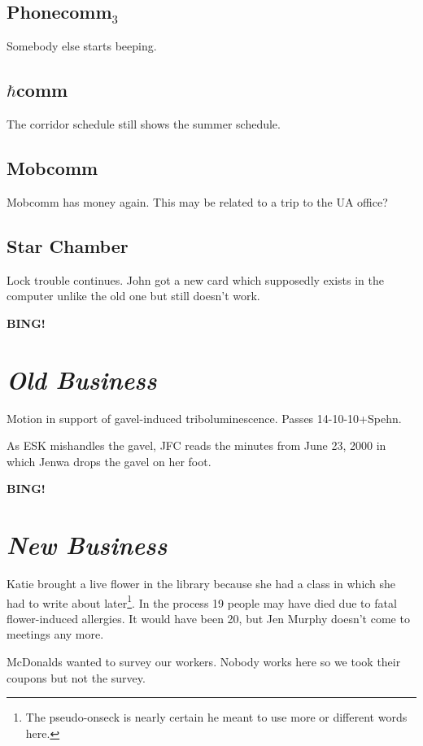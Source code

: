 \documentclass[10pt]{article}
\newcommand{\bing}{{\bf BING!} }
\newcommand{\goto}[1]{\bing \vskip 12pt \section*{{\em{#1}}}}
\begin{document}
\subsection*{Phonecomm$_3$}
Somebody else starts beeping.

\subsection*{$\hbar$comm}

The corridor schedule still shows the summer schedule.


\subsection*{Mobcomm}

Mobcomm has money again.  This may be related to a trip to the UA office?

\subsection*{Star Chamber}

Lock trouble continues.  John got a new card which supposedly
exists in the computer unlike the old one but still doesn't work.


\goto{Old Business}

Motion in support of gavel-induced triboluminescence.
Passes \hbox{14-10-10+Spehn}.

As ESK mishandles the gavel, JFC reads the minutes from June 23, 2000
in which Jenwa drops the gavel on her foot.

\goto{New Business}

Katie brought a live flower in the library because she had
a class in which she had to write about later\footnote{The
pseudo-onseck is nearly certain he meant to use more or different words here.}.
In the process 19 people may have died due to fatal flower-induced allergies.
It would have been 20, but Jen Murphy doesn't come to meetings any more.

McDonalds wanted to survey our workers.  Nobody works here so
we took their coupons but not the survey.
\end{document}
